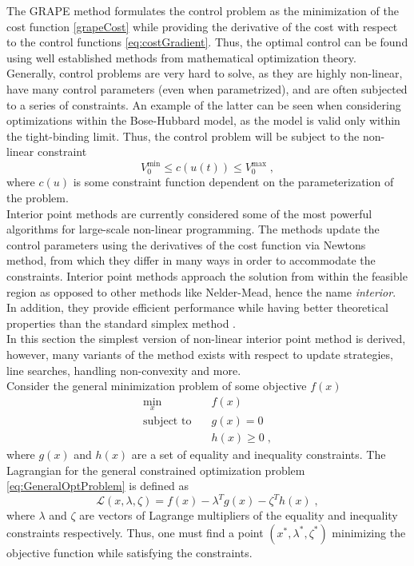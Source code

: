The GRAPE method formulates the control problem as the minimization of the cost function \eqref{grapeCost} while providing the derivative of the cost with respect to the control functions \eqref{eq:costGradient}. Thus, the optimal control can be found using well established methods from mathematical optimization theory. Generally, control problems are very hard to solve, as they are highly non-linear, have many control parameters (even when parametrized), and are often subjected to a series of constraints. An example of the latter can be seen when considering optimizations within the Bose-Hubbard model, as the model is valid only within the tight-binding limit. Thus, the control problem will be subject to the non-linear constraint
\begin{equation}
	 V_{0}^{\mathrm{min}} \leq c (u(t)) \leq V_{0}^{\mathrm{max}} \; ,
\end{equation}
where $c (u)$ is some constraint function dependent on the parameterization of the problem.\\
Interior point methods are currently considered some of the most powerful algorithms for large-scale non-linear programming. The methods update the control parameters using the derivatives of the cost function via Newtons method, from which they differ in many ways in order to accommodate the constraints. Interior point methods approach the solution from within the feasible region as opposed to other methods like Nelder-Mead, hence the name \textit{interior}. In addition, they provide efficient performance while having better theoretical properties than the standard simplex method \cite{wright}.\\

In this section the simplest version of non-linear interior point method is derived, however, many variants of the method exists with respect to update strategies, line searches, handling non-convexity and more.\\
Consider the general minimization problem of some objective $f(x)$
\begin{subequations}	
 \begin{align}
	\min_{x } 			\quad & f(x) 			\\
	\text{subject to} 	\quad & g(x) = 0  		\\ 
						   	  & h(x) \geq 0 	\; ,
\end{align}
\label{eq:GeneralOptProblem}
\end{subequations}
where $g(x)$ and $h(x)$ are a set of equality and inequality constraints. The Lagrangian for the general constrained optimization problem \eqref{eq:GeneralOptProblem} is defined as
\begin{equation}
	\mathcal{L}(x,\lambda,\zeta) = f(x) - \lambda^T g(x) - \zeta^T h(x)  \; ,
\end{equation}
where $\lambda$ and $\zeta$ are vectors of Lagrange multipliers of the equality and inequality constraints respectively. Thus, one must find a point $(x^*,\lambda^*,\zeta^*)$ minimizing the objective function while satisfying the constraints.

